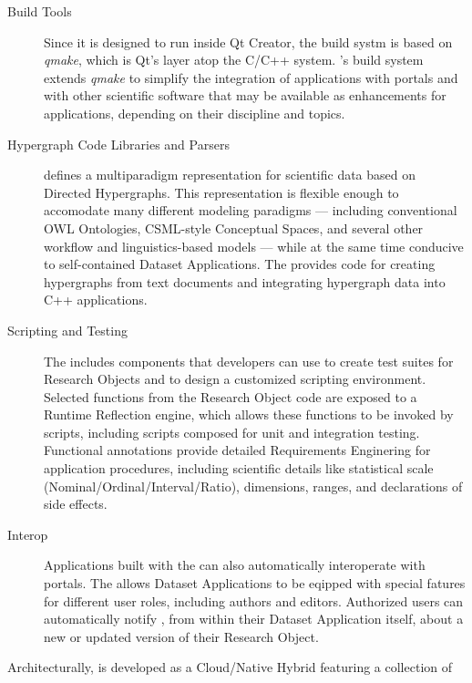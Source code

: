 \documentclass[11pt,letterpaper]{article}
\begin{document}
\begin{description}
\item[Build Tools]  Since it is designed to run 
inside Qt Creator, the {\RAK} build systm 
is based on \textit{qmake}, which is Qt's 
layer atop the C/C++  system.  
{\lMOSAIC}'s build system extends \textit{qmake} to 
simplify the integration of {\RAK} applications 
with {\MOSAIC} portals and with other scientific 
software that may be available as enhancements 
for {\RAK} applications, depending on their 
discipline and topics.

\item[Hypergraph Code Libraries and Parsers]  
{\lMOSAIC} defines a multiparadigm representation for 
scientific data based on Directed Hypergraphs.  
This representation is flexible enough to 
accomodate many different modeling 
paradigms --- including 
conventional OWL Ontologies, 
CSML-style Conceptual Spaces, and 
several other workflow and linguistics-based models 
--- while at the same time conducive to self-contained 
Dataset Applications.  The {\MOSAIC} {\SDK} provides 
code for creating hypergraphs from text documents and 
integrating hypergraph data into C++ applications.

\item[Scripting and Testing]  The {\MOSAIC} {\SDK} includes 
components that developers can use to create 
test suites for Research Objects and to design a 
customized scripting environment.  Selected 
functions from the Research Object code are exposed 
to a Runtime Reflection engine, which allows these 
functions to be invoked by scripts, including 
scripts composed for unit and integration testing.  
Functional annotations provide detailed Requirements 
Enginering for application procedures, including scientific 
details like statistical scale (Nominal/Ordinal/Interval/Ratio),
dimensions, ranges, and declarations of side effects.

\item[{\lMOSAIC} Interop]  Applications built 
with the {\MOSAIC} {\SDK} can also automatically 
interoperate with {\MOSAIC} portals.  The {\SDK} 
allows Dataset Applications to be eqipped 
with special fatures for different user roles, 
including authors and editors.  Authorized 
users can automatically notify {\MOSAIC}, 
from within their Dataset Application itself, about 
a new or updated version of their Research Object.
\end{description}
\p{}
Architecturally, {\MOSAIC} is developed as a 
Cloud/Native Hybrid featuring a collection of 
\end{document}
